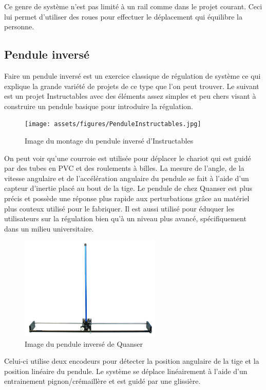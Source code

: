 Ce genre de système n'est pas limité à un rail comme dans le projet courant. Ceci lui permet d'utiliser des roues pour effectuer le déplacement qui équilibre la personne.

\subsection{Pendule inversé}

Faire un pendule inversé est un exercice classique de régulation de système ce qui explique la grande variété de projets de ce type que l'on peut trouver.
Le suivant est un projet Instructables avec des éléments assez simples et peu chers visant à construire un pendule basique pour introduire la régulation.

\begin{figure}[H]
    \centering
    \texttt{[image: assets/figures/PenduleInstructables.jpg]}
    \caption{Image du montage du pendule inversé d'Instructables \cite{Instructables}}
    \label{fig:Instructables}
\end{figure}

On peut voir qu'une courroie est utilisée pour déplacer le chariot qui est guidé par des tubes en PVC et des roulements à billes. La mesure de l'angle, de la vitesse angulaire et de l'accélération angulaire du pendule se fait à l'aide d'un capteur d'inertie placé au bout de la tige.
Le pendule de chez Quanser est plus précis et possède une réponse plus rapide aux perturbations grâce au matériel plus couteux utilisé pour le fabriquer. Il est aussi utilisé pour éduquer les utilisateurs sur la régulation bien qu'à un niveau plus avancé, spécifiquement dans un milieu universitaire.

\begin{figure}[H]
    \centering
    \includegraphics[width = 0.6\textwidth]{assets/figures/PenduleQuanser.png}
    \caption{Image du pendule inversé de Quanser \cite{Quanser}}
    \label{fig:Quanser}
\end{figure}

Celui-ci utilise deux encodeurs pour détecter la position angulaire de la tige et la position linéaire du pendule. Le système se déplace linéairement à l'aide d'un entrainement pignon/crémaillère et est guidé par une glissière.